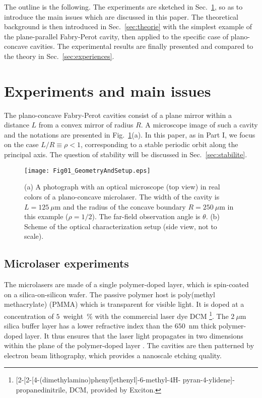 \documentclass[10pt]{iopart}
\begin{document}
The outline is the following. The experiments are sketched in Sec.~\ref{sec:experiences-intro}, so as to introduce the main issues which are discussed in this paper. The theoretical background is then introduced in Sec.~\ref{sec:theorie} with the simplest example of the plane-parallel Fabry-Perot cavity, then applied to the specific case of plano-concave cavities. The experimental results are finally presented and compared to the theory in Sec.~\ref{sec:experiences}.



\section{Experiments and main issues}\label{sec:experiences-intro}

The plano-concave Fabry-Perot cavities consist of a plane mirror within a distance $L$ from a convex mirror of radius $R$. A microscope image of such a cavity and the notations are presented in Fig.~\ref{fig:geomAndSetup}(a). In this paper, as in Part I, we focus on the case $L / R \equiv \rho < 1$, corresponding to a stable periodic orbit along the principal axis. The question of stability will be discussed in Sec.~\ref{sec:stabilite}.

\begin{figure}[tb]
\begin{center}
\texttt{[image: Fig01\_GeometryAndSetup.eps]}
\end{center}
\caption{(a) A photograph with an optical microscope (top view) in real colors of a plano-concave microlaser. The width of the cavity is $L = 125~\mu$m and the radius of the concave boundary $R = 250~\mu$m in this example ($\rho = 1/2$). The far-field observation angle is $\theta$. (b) Scheme of the optical characterization setup (side view, not to scale).}
\label{fig:geomAndSetup}
\end{figure}


\subsection{Microlaser experiments}

The microlasers are made of a single polymer-doped layer, which is spin-coated on a silica-on-silicon wafer. The passive polymer host is poly(methyl methacrylate) (PMMA) which is transparent for visible light. It is doped at a concentration of \mbox{$5$ weight \%} with the commercial laser dye DCM \footnote{[2-[2-[4-(dimethylamino)phenyl]ethenyl]-6-methyl-4H- pyran-4-ylidene]-propanedinitrile, DCM, provided by Exciton.}. The $2~\mu$m silica buffer layer has a lower refractive index than the $650$~nm thick polymer-doped layer. It thus ensures that the laser light propagates in two dimensions within the plane of the polymer-doped layer \cite{PRA-simples}. The cavities are then patterned by electron beam lithography, which provides a nanoscale etching quality.\\
\end{document}
